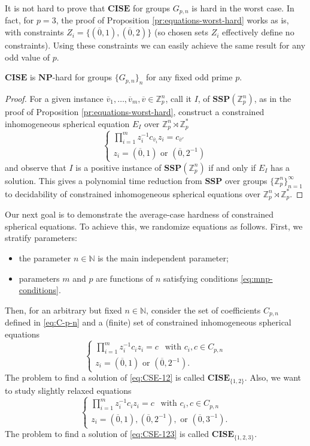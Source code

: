\documentclass{jgcc}
\def\ovo{{\overline{0}}}
\def\ovv{{\overline{v}}}
\def\NP{{\mathbf{NP}}}
\def\MN{{\mathbb{N}}}
\def\MZ{{\mathbb{Z}}}
\def\SSP{{\mathbf{SSP}}}
\def\CISE{{\mathbf{CISE}}}
\begin{document}
It is not hard to prove that $\CISE$ for groups $G_{p,n}$ 
is hard in the worst case.
In fact, for $p=3$, the proof of Proposition \ref{pr:equations-worst-hard}
works as is, with constraints $Z_i=\{(\ovo,1),(\ovo,2)\}$
(so chosen sets $Z_i$ effectively define no constraints).
Using these constraints we can easily achieve the same result 
for any odd value of $p$.

\begin{thm}
$\CISE$ is $\NP$-hard for groups $\{G_{p,n}\}_n$ for any fixed odd prime $p$.
\end{thm}

\begin{proof}
For a given instance $\ovv_1,\dots,\ovv_m,\ovv \in \MZ_p^n$, call it $I$,
of $\SSP(\MZ_p^n)$, as in the proof of Proposition \ref{pr:equations-worst-hard},
construct a constrained inhomogeneous spherical equation $E_I$ 
over $\MZ_p^n\rtimes\MZ_p^\ast$
$$
\left\{
\begin{array}{l}
\prod_{i=1}^m z_i^{-1}c_{\ovv_i} z_i = c_{\ovv'}\\
z_i = (\ovo,1) \mbox{ or } (\ovo,2^{-1})
\end{array}
\right.
$$
and observe that $I$ is a positive instance of $\SSP(\MZ_p^n)$
if and only if $E_I$ has a solution.
This gives a polynomial time reduction from 
$\SSP$ over groups $\{\MZ_p^n\}_{n=1}^\infty$
to decidability of constrained inhomogeneous spherical equations 
over $\MZ_p^n\rtimes\MZ_p^\ast$.
\end{proof}

Our next goal is to demonstrate the average-case hardness 
of constrained spherical equations. 
To achieve this, we randomize equations as follows.
First, we stratify parameters:
\begin{itemize}
\item 
the parameter $n\in\MN$ is the main independent parameter;
\item 
parameters $m$ and $p$ are functions of $n$ satisfying conditions
\eqref{eq:mnp-conditions}.
\end{itemize}
Then, for an arbitrary but fixed $n\in\MN$, consider 
the set of coefficients $C_{p,n}$
defined in \eqref{eq:C-p-n}
and a (finite) set of constrained inhomogeneous spherical equations 
\begin{equation}\label{eq:CSE-12}
\left\{
\begin{array}{l}
\prod_{i=1}^m z_i^{-1} c_i z_i= c\ \  \mbox{ with } c_i,c\in C_{p,n}\\
z_i=(\ovo,1)\mbox{ or }(\ovo,2^{-1}).
\end{array}
\right.
\end{equation}
The problem to find a solution of \eqref{eq:CSE-12} is called $\CISE_{\{1,2\}}$. 
Also, we want to study slightly relaxed equations 
\begin{equation}\label{eq:CSE-123}
\left\{
\begin{array}{l}
\prod_{i=1}^m z_i^{-1} c_i z_i= c\ \  \mbox{ with } c_i,c\in C_{p,n}\\
z_i=(\ovo,1),(\ovo,2^{-1}),\mbox{ or }(\ovo,3^{-1}).
\end{array}
\right.
\end{equation}
The problem to find a solution of \eqref{eq:CSE-123} is called 
$\CISE_{\{1,2,3\}}$.
\end{document}
